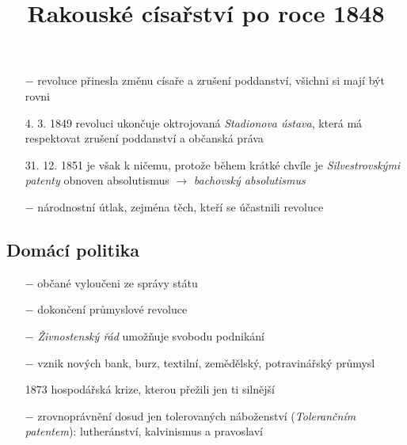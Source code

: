 \documentclass{article}
\title{\vspace{-2cm}Rakouské císařství po roce 1848\vspace{-1.7cm}}
\date{}
\author{}
\begin{document}
\maketitle

\begin{itemize}
    \vspace{-0.5em}
    \setlength\itemsep{0.15em}
    \item[$-$] revoluce přinesla změnu císaře a zrušení poddanství, všichni si mají být rovni
    \item[4. 3. 1849] revoluci ukončuje oktrojovaná \textit{Stadionova ústava}, která má respektovat zrušení poddanství a občanská práva
    \item[31. 12. 1851] je však k ničemu, protože během krátké chvíle je \textit{Silvestrovskými patenty} obnoven absolutismus $\rightarrow$ \textit{bachovský absolutismus}
    \item[$-$] národnostní útlak, zejména těch, kteří se účastnili revoluce
\end{itemize}

\subsection*{Domácí politika}
\begin{itemize}
    \vspace{-0.5em}
    \setlength\itemsep{0.15em}
    \item[$-$] občané vyloučeni ze správy státu
    \item[$-$] dokončení průmyslové revoluce
    \item[$-$] \textit{Živnostenský řád} umožňuje svobodu podnikání
    \item[$-$] vznik nových bank, burz, textilní, zemědělský, potravinářský průmysl
    \item[1873] hospodářská krize, kterou přežili jen ti silnější
    \item[$-$] zrovnoprávnění dosud jen tolerovaných náboženství (\textit{Tolerančním patentem}): lutheránství, kalvinismus a pravoslaví
\end{itemize}
\end{document}
